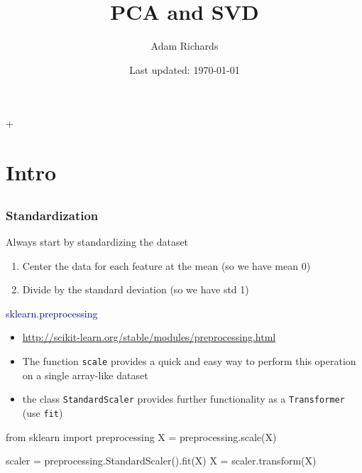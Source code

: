 \documentclass[table,dvipsnames]{beamer}
\title[time]{PCA and SVD}
\author[AJR]{Adam Richards}
\institute{Galvanize, Inc}
\date[\today]{Last updated: \today}
\newcommand{\highlt}{\textcolor{darkblue}}
\begin{document}
\frame{\titlepage}
\frame{
\footnotesize
\tableofcontents
\normalsize
}

+%
\section{Intro}
\subsection{}


\begin{frame}[fragile]
\frametitle{Standardization}
\footnotesize
Always start by standardizing the dataset

\begin{enumerate}
 \item Center the data for each feature at the mean (so we have mean 0)
 \item Divide by the standard deviation (so we have std 1)
\end{enumerate}

\highlt{sklearn.preprocessing}
\begin{itemize}
 \item \href{http://scikit-learn.org/stable/modules/preprocessing.html}{http://scikit-learn.org/stable/modules/preprocessing.html}
 \item The function \texttt{scale} provides a quick and easy way to perform this operation on a single array-like dataset
 \item the class \texttt{StandardScaler} provides further functionality as a \texttt{Transformer} (use \texttt{fit})
\end{itemize}

\begin{code}
from sklearn import preprocessing
X = preprocessing.scale(X)

scaler = preprocessing.StandardScaler().fit(X)
X = scaler.transform(X) 
\end{code} 
\end{frame}
\end{document}
